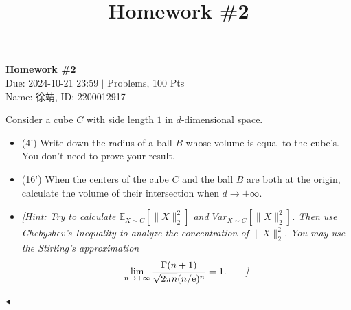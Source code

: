 \documentclass[11pt]{article}
\title{Homework \#2}
\newenvironment{problem}[2][Problem]{\begin{trivlist}
\item[\hskip \labelsep {\bfseries #1}\hskip \labelsep {\bfseries #2.}]}{\hfill$\blacktriangleleft$\end{trivlist}}
\begin{document}
\pagestyle{fancy}
\chead{}

\begin{center}
    {\LARGE \bf Homework \#2}\\
    {Due: 2024-10-21 23:59 \quad$|$ Problems, 100 Pts}\\
    {Name: 徐靖, ID: 2200012917}            %
\end{center}


\begin{problem}{1 (20')} Consider a cube $C$ with side length $1$ in $d$-dimensional space.
\begin{itemize}
    \item [(1)] (4') Write down the radius of a ball $B$ whose volume is equal to the cube's. You don't need to prove your result.
    \item [(2)] (16') When the centers of the cube $C$ and the ball $B$ are both at the origin, calculate the volume of their intersection when $d\to+\infty$.
    \item [] \textit{[Hint: Try to calculate $\mathbb{E}_{X\sim C}[\|X\|_2^2]$ and $Var_{X\sim C}[\|X\|_2^2]$. Then use Chebyshev's Inequality to analyze the concentration of $\|X\|_2^2$. You may use the Stirling's approximation}
    \begin{align*}
        \lim_{n\to+\infty}\frac{\Gamma(n+1)}{\sqrt{2\pi n}(n/\mathrm{e})^n}=1.\tag*{\textit{]}}
    \end{align*}
\end{itemize}
\end{problem}
\end{document}
